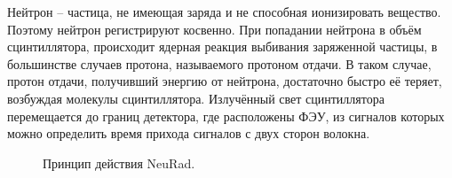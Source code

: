 

Нейтрон – частица, не имеющая заряда и не способная ионизировать вещество. Поэтому нейтрон регистрируют косвенно. При попадании нейтрона в объём сцинтиллятора, происходит ядерная реакция выбивания заряженной частицы, в большинстве случаев протона, называемого протоном отдачи. В таком случае, протон отдачи, получивший энергию от нейтрона, достаточно быстро её теряет, возбуждая молекулы сцинтиллятора. Излучённый свет сцинтиллятора перемещается до границ детектора, где расположены ФЭУ, из сигналов которых можно определить время прихода сигналов с двух сторон волокна. 

\begin{figure}[h]
	\caption{Принцип действия NeuRad.}
	\label{ris:neuradPrinciple}
\end{figure}

